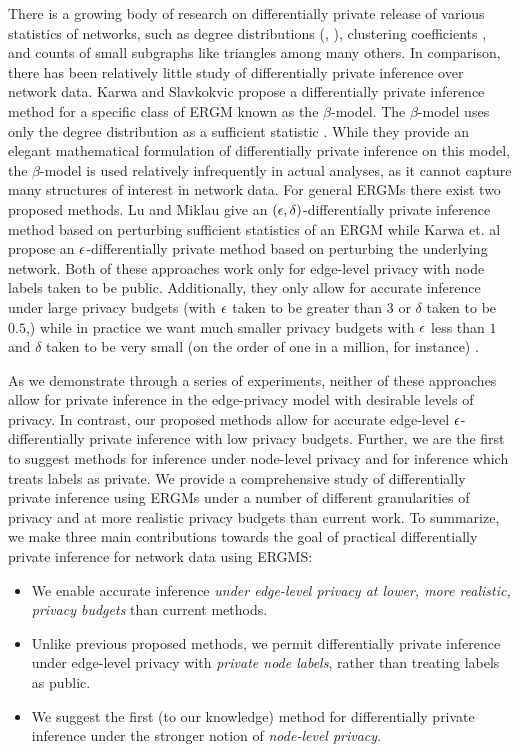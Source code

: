 There is a growing body of research on differentially private release of various statistics of networks, such as degree distributions (\cite{HLMJ09}, \cite{WNM16}), clustering coefficients \cite{WWZX12}, and counts of small subgraphs like triangles \cite{KRSY14} among many others. In comparison, there has been relatively little study of differentially private inference over network data. Karwa and Slavkokvic propose a differentially private inference method for a specific class of ERGM known as the $\beta$-model. The $\beta$-model uses only the degree distribution as a sufficient statistic \cite{KS16}. While they provide an elegant mathematical formulation of differentially private inference on this model, the $\beta$-model is used relatively infrequently in actual analyses, as it cannot capture many structures of interest in network data. For general ERGMs there exist two proposed methods. Lu and Miklau \cite{LM14} give an $(\epsilon, \delta)$-differentially private inference method based on perturbing sufficient statistics of an ERGM while Karwa et. al \cite{KKS17} propose an $\epsilon$-differentially private method based on perturbing the underlying network. Both of these approaches work only for edge-level privacy with node labels taken to be public. Additionally, they only allow for accurate inference under large privacy budgets (with $\epsilon$ taken to be greater than $3$ or $\delta$ taken to be $0.5$,) while in practice we want much smaller privacy budgets with $\epsilon$ less than $1$ and $\delta$ taken to be very small (on the order of one in a million, for instance) \cite{N17}. 

As we demonstrate through a series of experiments, neither of these approaches allow for private inference in the edge-privacy model with desirable levels of privacy. In contrast, our proposed methods allow for accurate edge-level $\epsilon$-differentially private inference with low privacy budgets. Further, we are the first to suggest methods for inference under node-level privacy and for inference which treats labels as private. We provide a comprehensive study of differentially private inference using ERGMs under a number of different granularities of privacy and at more realistic privacy budgets than current work. To summarize, we make three main contributions towards the goal of practical differentially private inference for network data using ERGMS:
\begin{itemize}
	\item We enable accurate inference \emph{under edge-level privacy at lower, more realistic, privacy budgets} than current methods.
	\item Unlike previous proposed methods, we permit differentially private inference under edge-level privacy with \emph{private node labels}, rather than treating labels as public.
	\item We suggest the first (to our knowledge) method for differentially private inference under the stronger notion of \emph{node-level privacy}.
\end{itemize}

